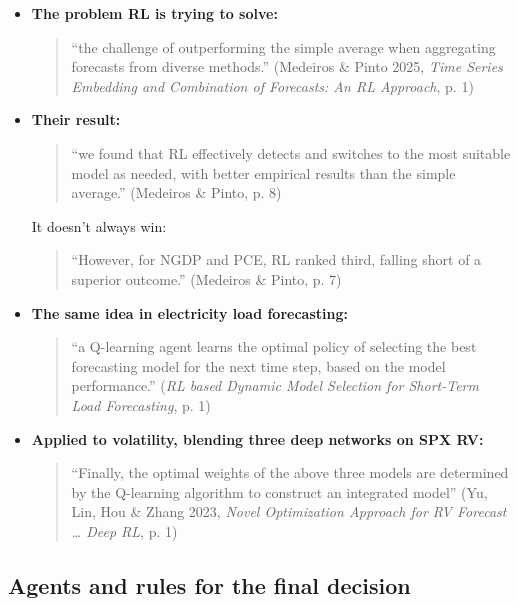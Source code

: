 \documentclass{article}
\begin{document}
\begin{itemize}

\item \textbf{The problem RL is trying to solve:}

\begin{quote}``the challenge of outperforming the simple average when aggregating forecasts from diverse methods.'' (Medeiros \& Pinto 2025, \emph{Time Series Embedding and Combination of Forecasts: An RL Approach}, p. 1)\end{quote}

\item \textbf{Their result:}

\begin{quote}``we found that RL effectively detects and switches to the most suitable model as needed, with better empirical results than the simple average.'' (Medeiros \& Pinto, p. 8)\end{quote}

It doesn't always win:

\begin{quote}``However, for NGDP and PCE, RL ranked third, falling short of a superior outcome.'' (Medeiros \& Pinto, p. 7)\end{quote}

\item \textbf{The same idea in electricity load forecasting:}

\begin{quote}``a Q-learning agent learns the optimal policy of selecting the best forecasting model for the next time step, based on the model performance.'' (\emph{RL based Dynamic Model Selection for Short-Term Load Forecasting}, p. 1)\end{quote}

\item \textbf{Applied to volatility, blending three deep networks on SPX RV:}

\begin{quote}``Finally, the optimal weights of the above three models are determined by the Q-learning algorithm to construct an integrated model'' (Yu, Lin, Hou \& Zhang 2023, \emph{Novel Optimization Approach for RV Forecast \ldots{} Deep RL}, p. 1)\end{quote}

\end{itemize}

\subsection{Agents and rules for the final decision}
\end{document}

